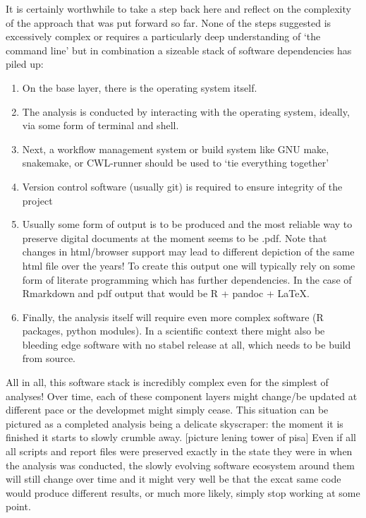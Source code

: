 \documentclass[]{book}
\providecommand{\tightlist}{%
  \setlength{\itemsep}{0pt}\setlength{\parskip}{0pt}}
\begin{document}
It is certainly worthwhile to take a step back here and reflect on the
complexity of the approach that was put forward so far. None of the
steps suggested is excessively complex or requires a particularly deep
understanding of `the command line' but in combination a sizeable stack
of software dependencies has piled up:

\begin{enumerate}
\def\labelenumi{\arabic{enumi}.}
\tightlist
\item
  On the base layer, there is the operating system itself.
\item
  The analysis is conducted by interacting with the operating system,
  ideally, via some form of terminal and shell.
\item
  Next, a workflow management system or build system like GNU make,
  snakemake, or CWL-runner should be used to `tie everything together'
\item
  Version control software (usually git) is required to ensure integrity
  of the project
\item
  Usually some form of output is to be produced and the most reliable
  way to preserve digital documents at the moment seems to be .pdf. Note
  that changes in html/browser support may lead to different depiction
  of the same html file over the years! To create this output one will
  typically rely on some form of literate programming which has further
  dependencies. In the case of Rmarkdown and pdf output that would be R
  + pandoc + LaTeX.
\item
  Finally, the analysis itself will require even more complex software
  (R packages, python modules). In a scientific context there might also
  be bleeding edge software with no stabel release at all, which needs
  to be build from source.
\end{enumerate}

All in all, this software stack is incredibly complex even for the
simplest of analyses! Over time, each of these component layers might
change/be updated at different pace or the developmet might simply
cease. This situation can be pictured as a completed analysis being a
delicate skyscraper: the moment it is finished it starts to slowly
crumble away. {[}picture lening tower of pisa{]} Even if all all scripts
and report files were preserved exactly in the state they were in when
the analysis was conducted, the slowly evolving software ecosystem
around them will still change over time and it might very well be that
the excat same code would produce different results, or much more
likely, simply stop working at some point.
\end{document}
